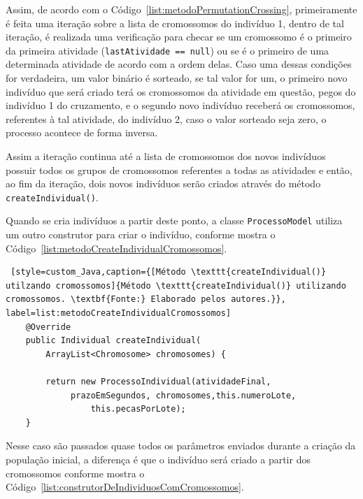 \par Assim, de acordo com o Código~\ref{list:metodoPermutationCrossing}, primeiramente é feita uma iteração sobre a lista de cromossomos do indivíduo 1, dentro de tal iteração, é realizada uma verificação para checar se um cromossomo é o primeiro da primeira atividade (\texttt{lastAtividade == null}) ou se é o primeiro de uma determinada atividade de acordo com a ordem delas. Caso uma dessas condições for verdadeira, um valor binário é sorteado, se tal valor for um, o primeiro novo indivíduo que será criado terá os cromossomos da atividade em questão, pegos do indivíduo 1 do cruzamento, e o segundo novo indivíduo receberá os cromossomos, referentes à tal atividade, do indivíduo 2, caso o valor sorteado seja zero, o processo acontece de forma inversa. 

\par Assim a iteração continua até a lista de cromossomos dos novos indivíduos possuir todos os grupos de cromossomos referentes a todas as atividades e então, ao fim da iteração, dois novos indivíduos serão criados através do método \texttt{createIndividual()}.

\par Quando se cria indivíduos a partir deste ponto, a classe \texttt{ProcessoModel} utiliza um outro construtor para criar o indivíduo, conforme mostra o Código~\ref{list:metodoCreateIndividualCromossomos}.


\begin{lstlisting} [style=custom_Java,caption={[Método \texttt{createIndividual()} utilzando cromossomos]{Método \texttt{createIndividual()} utilizando cromossomos. \textbf{Fonte:} Elaborado pelos autores.}}, label=list:metodoCreateIndividualCromossomos] 
	@Override
	public Individual createIndividual(
		ArrayList<Chromosome> chromosomes) {
		
		return new ProcessoIndividual(atividadeFinal,
			 prazoEmSegundos, chromosomes,this.numeroLote,
				 this.pecasPorLote);
	}

\end{lstlisting}

\par Nesse caso são passados quase todos os parâmetros enviados durante a criação
da população inicial, a diferença é que o indivíduo será criado a partir 
dos cromossomos conforme mostra o Código~\ref{list:construtorDeIndividuosComCromossomos}.


